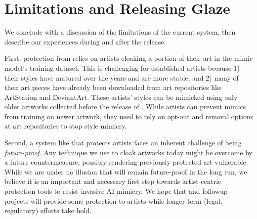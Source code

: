 \vspace{-0.1in}
\section{Limitations and Releasing Glaze}
We conclude with a discussion of the limitations of the current system,
then describe our experiences during and after the \system{} release.

  First, protection from \system{} relies on artists cloaking
a portion of their art in the mimic model's training dataset. This is
challenging for established artists because 1) their styles have matured over
the years and are more stable, and 2) many of their art pieces have already
been downloaded from art repositories like ArtStation and DeviantArt. These
artists' styles can be mimicked using only older artworks collected before
the release of \system.  While artists can prevent mimics from training on
newer artwork, they need to rely on opt-out and removal options at art
repositories to stop style mimicry.

Second, a system like \system{} that protects artists faces an inherent
challenge of being {\em future-proof}. Any technique we use to cloak artworks
today might be overcome by a future countermeasure, possibly rendering
previously protected art vulnerable. While we are under no illusion that
\system{} will remain future-proof in the long run, we believe it is an important and
necessary first step towards artist-centric protection tools to
resist invasive AI mimicry. We hope that \system{} and followup projects 
will provide some protection to artists while longer term (legal, regulatory)
efforts take hold.


